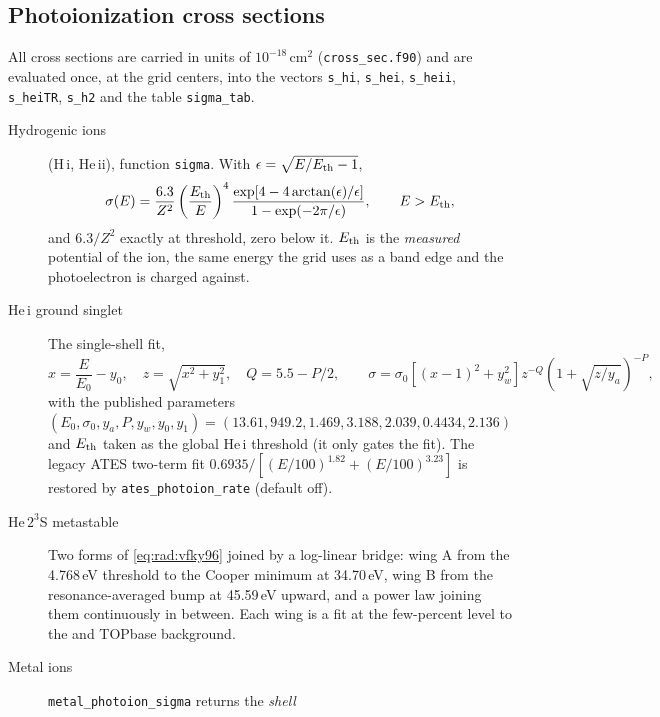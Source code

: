 \subsection{Photoionization cross sections}
\label{sec:radiation:crosssec}

All cross sections are carried in units of $10^{-18}$\,cm$^{2}$
(\texttt{cross\_sec.f90}) and are evaluated once, at the grid centers, into
the vectors \texttt{s\_hi}, \texttt{s\_hei}, \texttt{s\_heii},
\texttt{s\_heiTR}, \texttt{s\_h2} and the table \texttt{sigma\_tab}.

\begin{description}
\item[Hydrogenic ions] (H\,{\sc i}, He\,{\sc ii}), function
  \texttt{sigma}. With $\epsilon = \sqrt{E/E_{\rm th}-1}$,
  \begin{equation}
  \sigma(E) = \frac{6.3}{Z^{2}}\left(\frac{E_{\rm th}}{E}\right)^{4}
  \frac{\exp\!\left[4-4\arctan(\epsilon)/\epsilon\right]}
       {1-\exp(-2\pi/\epsilon)},\qquad E>E_{\rm th},
  \label{eq:rad:hydrogenic}
  \end{equation}
  and $6.3/Z^{2}$ exactly at threshold, zero below it. $E_{\rm th}$ is the
  \emph{measured} potential of the ion, the same energy the grid uses as a
  band edge and the photoelectron is charged against.
\item[He\,{\sc i} ground singlet] The \citet{Verner1996} single-shell fit,
  \begin{equation}
  x = \frac{E}{E_0}-y_0,\quad z=\sqrt{x^{2}+y_1^{2}},\quad Q=5.5-P/2,
  \qquad
  \sigma = \sigma_0\left[(x-1)^{2}+y_w^{2}\right]z^{-Q}
           \left(1+\sqrt{z/y_a}\right)^{-P},
  \label{eq:rad:vfky96}
  \end{equation}
  with the published parameters $(E_0,\sigma_0,y_a,P,y_w,y_0,y_1) =
  (13.61, 949.2, 1.469, 3.188, 2.039, 0.4434, 2.136)$ and $E_{\rm th}$ taken
  as the global He\,{\sc i} threshold (it only gates the fit). The legacy
  ATES two-term fit $0.6935/[(E/100)^{1.82}+(E/100)^{3.23}]$ is restored by
  \texttt{ates\_photoion\_rate} (default off).
\item[He\,$2^3$S metastable] Two forms of \eqref{eq:rad:vfky96} joined by a
  log-linear bridge: wing A from the 4.768\,eV threshold to the Cooper
  minimum at 34.70\,eV, wing B from the resonance-averaged bump at 45.59\,eV
  upward, and a power law joining them continuously in between. Each wing is
  a fit at the few-percent level to the \citet{Norcross1971} and TOPbase
  background.
\item[Metal ions] \texttt{metal\_photoion\_sigma} returns the \emph{shell
}
\end{description}
